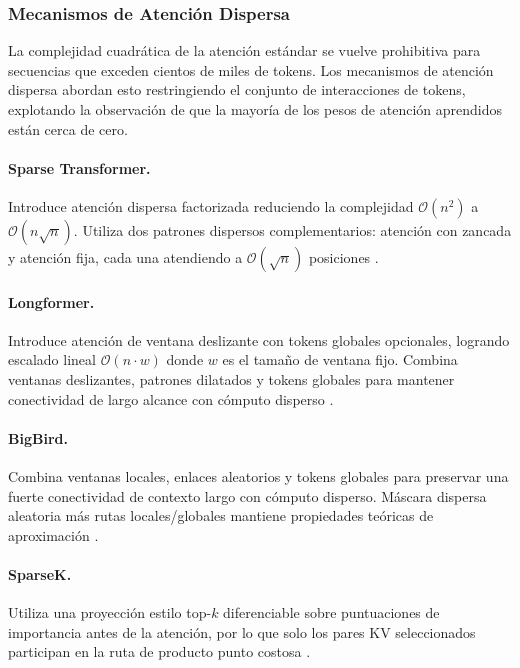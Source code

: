 \documentclass[11pt,a4paper]{article}
\begin{document}
\subsubsection{Mecanismos de Atención Dispersa}

La complejidad cuadrática de la atención estándar se vuelve prohibitiva para secuencias que exceden cientos de miles de tokens. Los mecanismos de atención dispersa abordan esto restringiendo el conjunto de interacciones de tokens, explotando la observación de que la mayoría de los pesos de atención aprendidos están cerca de cero.

\paragraph{Sparse Transformer.}
Introduce atención dispersa factorizada reduciendo la complejidad $\mathcal{O}(n^2)$ a $\mathcal{O}(n\sqrt{n})$. Utiliza dos patrones dispersos complementarios: atención con zancada y atención fija, cada una atendiendo a $\mathcal{O}(\sqrt{n})$ posiciones \citep{child_sparse_transformer_2019}.

\paragraph{Longformer.}
Introduce atención de ventana deslizante con tokens globales opcionales, logrando escalado lineal $\mathcal{O}(n \cdot w)$ donde $w$ es el tamaño de ventana fijo. Combina ventanas deslizantes, patrones dilatados y tokens globales para mantener conectividad de largo alcance con cómputo disperso \citep{beltagy_longformer_2020}.

\paragraph{BigBird.}
Combina ventanas locales, enlaces aleatorios y tokens globales para preservar una fuerte conectividad de contexto largo con cómputo disperso. Máscara dispersa aleatoria más rutas locales/globales mantiene propiedades teóricas de aproximación \citep{zaheer_bigbird_2020}.

\paragraph{SparseK.}
Utiliza una proyección estilo top-$k$ diferenciable sobre puntuaciones de importancia antes de la atención, por lo que solo los pares KV seleccionados participan en la ruta de producto punto costosa \citep{lou_sparsek_2024}.
\end{document}
